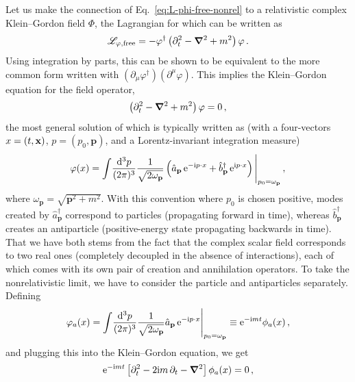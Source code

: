 Let us make the connection of Eq.~\eqref{eq:L-phi-free-nonrel} to a
relativistic complex Klein--Gordon field $\Phi$, the Lagrangian for which can be 
written as
%
\begin{equation}
 \mathcal{L}_{\varphi,\text{free}}
 = {-}\varphi^\dagger\left(\partial_t^2 - \boldsymbol{\nabla}^2 + m^2\right)\varphi 
\,.
\end{equation}
%
Using integration by parts, this can be shown to be equivalent to the more 
common form written with $(\partial_\mu\varphi^\dagger)(\partial^\mu\varphi)$.  
This implies the Klein--Gordon equation for the field operator,
%
\begin{equation}
 \left(\partial_t^2 - \boldsymbol{\nabla}^2 + m^2\right)\varphi = 0 \,,
\end{equation}
%
the most general solution of which is typically written as (with a 
four-vectors $x=(t,\mathbf{x})$, $p=(p_0,{\mathbf{p}})$, and a Lorentz-invariant integration 
measure)
%
\begin{equation}
 \varphi(x)
 = \int\!\frac{\dd^3p}{(2\pi)^3} \frac{1}{\sqrt{2\omega_{\mathbf{p}}}}\left(
 \hat{a}_{\mathbf{p}}\,\eex^{-\ii p\cdot x} + \hat{b}^\dagger_{\mathbf{p}}\,\eex^{\ii p\cdot x}
 \right)\Bigg|_{p_0=\omega_{\mathbf{p}}} \,,
\label{eq:Phi}
\end{equation}
%
where $\omega_{\mathbf{p}} = \sqrt{{\mathbf{p}}^2+m^2}$.  With this convention where $p_0$ is 
chosen positive, modes created by $\hat{a}^\dagger_{\mathbf{p}}$ correspond to particles 
(propagating forward in time), whereas $\hat{b}^\dagger_{\mathbf{p}}$ creates an 
antiparticle (positive-energy state propagating backwards in time).  That we 
have both stems from the fact that the complex scalar field corresponds to two 
real ones (completely decoupled in the absence of interactions), each of which 
comes with its own pair of creation and annihilation operators.  To take 
the nonrelativistic limit, we have to consider the particle and antiparticles 
separately.  Defining
%
\begin{equation}
 \varphi_a(x) = \int\!\frac{\dd^3p}{(2\pi)^3} \frac{1}{\sqrt{2\omega_{\mathbf{p}}}}
 \hat{a}_{\mathbf{p}}\,\eex^{-\ii p\cdot x}\Bigg|_{p_0=\omega_{\mathbf{p}}}
 \equiv \eex^{-\ii m t} \phi_a(x) \,,
\label{eq:Phi-phi-a}
\end{equation}
%
and plugging this into the Klein--Gordon equation, we get
%
\begin{equation}
 \eex^{-\ii m t} \left[\partial_t^2 - 2\ii m\,\partial_t
 - \vNabla^2\right] \phi_a(x) = 0 \,,
\label{eq:KG-phi-a}
\end{equation}
